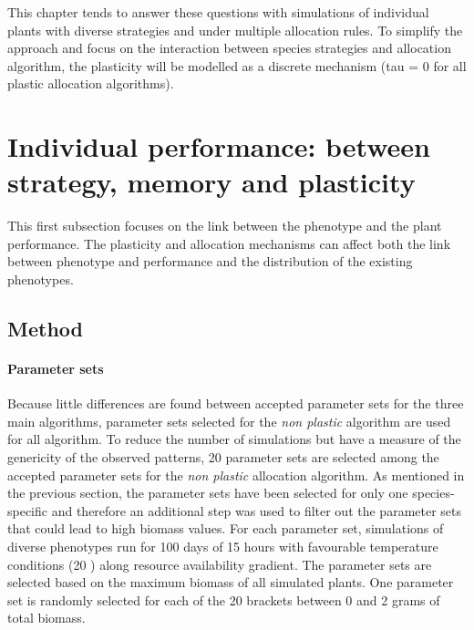 This chapter tends to answer these questions with simulations of individual plants with diverse strategies and under multiple allocation rules. To simplify the approach and focus on the interaction between species strategies and allocation algorithm, the plasticity will be modelled as a discrete mechanism (tau = 0 for all plastic allocation algorithms).

\section{Individual performance: between strategy, memory and plasticity}\label{section:landscape}

This first subsection focuses on the link between the phenotype and the plant performance. The plasticity and allocation mechanisms can affect both the link between phenotype and performance and the distribution of the existing phenotypes.



\subsection{Method}

\paragraph{Parameter sets}
Because little differences are found between accepted parameter sets for the three main algorithms, parameter sets selected for the \textit{non plastic} algorithm are used for all algorithm. To reduce the number of simulations but have a measure of the genericity of the observed patterns, 20 parameter sets are selected among the accepted parameter sets for the \textit{non plastic} allocation algorithm. As mentioned in the previous section, the parameter sets have been selected for only one species-specific and therefore an additional step was used to filter out the parameter sets that could lead to high biomass values. For each parameter set, simulations of diverse phenotypes run for 100 days of 15 hours with favourable temperature conditions (20 \celsius) along resource availability gradient. The parameter sets are selected based on the maximum biomass of all simulated plants. One parameter set is randomly selected for each of the 20 brackets between 0 and 2 grams of total biomass.

